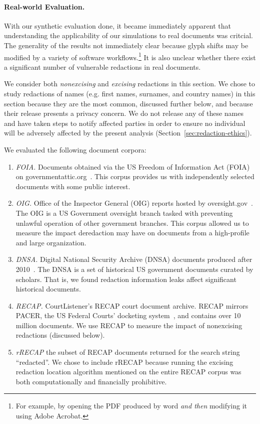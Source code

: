 \paragraph{Real-world Evaluation.}

With our synthetic evaluation done, it became immediately apparent that understanding the applicability of our simulations to real documents was critcial.
The generality of the results not immediately clear because glyph shifts may be modified by a variety of software workflows.\footnote{
    For example, by opening the PDF produced by word \emph{and then} modifying it using Adobe Acrobat. 
}
It is also unclear whether there exist a significant number of vulnerable redactions in real documents.

We consider both \emph{nonexcising} and \emph{excising} redactions in this section.
We chose to study redactions of names (e.g. first names, surnames, and country names) in this section because they are the most common, discussed further below, and because their release presents a privacy concern.
We do not release any of these names and have taken steps to notify affected parties in order to ensure no individual will be adversely affected by the present analysis (Section~\ref{sec:redaction-ethics}).

We evaluated the following document corpora: 

\begin{enumerate}
    \item \emph{FOIA.} Documents obtained via the US Freedom of Information Act (FOIA) on governmentattic.org~\cite{govattic}. 
This corpus provides us with independently selected documents with some public interest.
    \item \emph{OIG.} Office of the Inspector General (OIG) reports hosted by oversight.gov~\cite{oigReports}. 
The OIG is a US Government oversight branch tasked with preventing unlawful operation of other government branches.
This corpus allowed us to measure the impact deredaction may have on documents from a high-profile and large organization.
    \item \emph{DNSA.} Digital National Security Archive (DNSA) documents produced after 2010~\cite{dnsaSite}. 
The DNSA is a set of historical US government documents curated by scholars. 
That is, we found redaction information leaks affect significant historical documents.
    \item \emph{RECAP.} CourtListener's RECAP court document archive.
RECAP mirrors PACER, the US Federal Courts' docketing system~\cite{pacerSite}, and contains over 10 million documents.
We use RECAP to measure the impact of nonexcising redactions (discussed below).
    \item \emph{rRECAP} the subset of RECAP documents returned for the search string ``redacted''.
We chose to include rRECAP because running the excising redaction location algorithm mentioned on the entire RECAP corpus was both computationally and financially prohibitive.
\end{enumerate}

